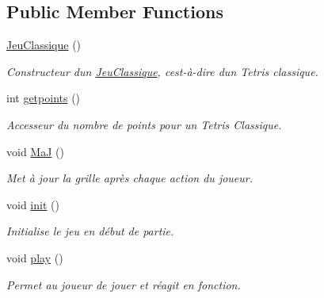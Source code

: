 \subsection*{Public Member Functions}
\begin{DoxyCompactItemize}
\item 
\mbox{\label{classJeuClassique_a9b8c0cab457b50d054746d71318be396}} 
\hyperlink{classJeuClassique_a9b8c0cab457b50d054746d71318be396}{Jeu\+Classique} ()
\begin{DoxyCompactList}\small\item\em Constructeur d\textquotesingle{}un \hyperlink{classJeuClassique}{Jeu\+Classique}, c\textquotesingle{}est-\/à-\/dire d\textquotesingle{}un Tetris classique. \end{DoxyCompactList}\item 
int \hyperlink{classJeuClassique_ab6429ffc180431b667e891e329c91cb4}{getpoints} ()
\begin{DoxyCompactList}\small\item\em Accesseur du nombre de points pour un Tetris Classique. \end{DoxyCompactList}\item 
\mbox{\label{classJeuClassique_ad61cdc881a8f6532a9bc59e91e64affb}} 
void \hyperlink{classJeuClassique_ad61cdc881a8f6532a9bc59e91e64affb}{MaJ} ()
\begin{DoxyCompactList}\small\item\em Met à jour la grille après chaque action du joueur. \end{DoxyCompactList}\item 
\mbox{\label{classJeuClassique_ab8546f30212be75a66c5735ed7fb9de4}} 
void \hyperlink{classJeuClassique_ab8546f30212be75a66c5735ed7fb9de4}{init} ()
\begin{DoxyCompactList}\small\item\em Initialise le jeu en début de partie. \end{DoxyCompactList}\item 
\mbox{\label{classJeuClassique_a0d8df25a0df26319718f0c7e83b5670d}} 
void \hyperlink{classJeuClassique_a0d8df25a0df26319718f0c7e83b5670d}{play} ()
\begin{DoxyCompactList}\small\item\em Permet au joueur de jouer et réagit en fonction. \end{DoxyCompactList}\end{DoxyCompactItemize}


